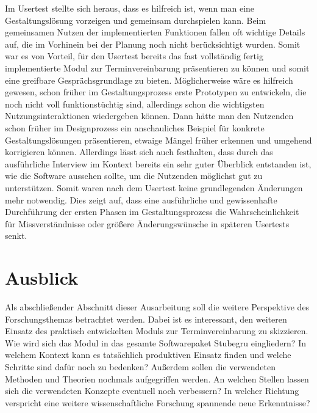 Im Usertest stellte sich heraus, dass es hilfreich ist, wenn man
eine Gestaltungslösung vorzeigen und gemeinsam durchspielen kann. Beim
gemeinsamen Nutzen der implementierten Funktionen fallen oft wichtige Details
auf, die im Vorhinein bei der Planung noch nicht berücksichtigt wurden. Somit
war es von Vorteil, für den Usertest bereits das fast vollständig
fertig implementierte Modul zur Terminvereinbarung präsentieren zu können und
somit eine greifbare Gesprächsgrundlage zu bieten. Möglicherweise wäre es hilfreich
gewesen, schon früher im Gestaltungsprozess erste Prototypen zu entwickeln, die
noch nicht voll funktionstüchtig sind, allerdings schon die wichtigsten
Nutzungsinteraktionen wiedergeben können. Dann hätte man den Nutzenden schon
früher im Designprozess ein anschauliches Beispiel für konkrete
Gestaltungslösungen präsentieren, etwaige Mängel
früher erkennen und umgehend korrigieren können. Allerdings lässt sich
auch festhalten, dass durch das ausführliche Interview im Kontext bereits ein
sehr guter Überblick entstanden ist, wie die Software aussehen sollte, um die
Nutzenden möglichst gut zu unterstützen. Somit waren nach dem Usertest
keine grundlegenden Änderungen mehr notwendig. Dies zeigt auf, dass
eine ausführliche und gewissenhafte Durchführung der ersten Phasen im
Gestaltungsprozess die Wahrscheinlichkeit für Missverständnisse oder größere
Änderungswünsche in späteren Usertests senkt.

\section{Ausblick}
\label{subsection:outlook}

Als abschließender Abschnitt dieser Ausarbeitung soll die weitere Perspektive
des Forschungsthemas betrachtet werden. Dabei ist es interessant, den weiteren
Einsatz des praktisch entwickelten Moduls zur Terminvereinbarung zu skizzieren.
Wie wird sich das Modul in das gesamte Softwarepaket Stubegru eingliedern? In
welchem Kontext kann es tatsächlich produktiven Einsatz finden und welche
Schritte sind dafür noch zu bedenken? Außerdem sollen die verwendeten Methoden
und Theorien nochmals aufgegriffen werden. An welchen Stellen lassen sich die
verwendeten Konzepte eventuell noch verbessern? In welcher Richtung verspricht
eine weitere wissenschaftliche Forschung spannende neue Erkenntnisse?

